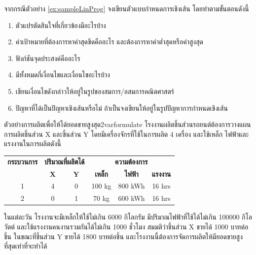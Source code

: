 \begin{example}{}{}
    จากกรณีตัวอย่าง \ref{ex:sampleLinProg} จงเขียนตัวแบบกำหนดการเชิงเส้น โดยทำตามขั้นตอนดังนี้
    \begin{enumerate}
        \item ตัวแปรตัดสินใจที่เกี่ยวข้องมีอะไรบ้าง
        \item ค่าเป้าหมายที่ต้องการหาค่าสุดขีดคืออะไร และต้องการหาค่าต่ำสุดหรือค่าสูงสุด
        \item ฟังก์ชันจุดประสงค์คืออะไร
        \item มีทั้งหมดกี่เงื่อนไขและเงื่อนไขอะไรบ้าง
        \item เขียนเงื่อนไขดังกล่าวให้อยู่ในรูปของสมการ/อสมการคณิตศาสตร์
        \item ปัญหาที่ได้เป็นปัญหาเชิงเส้นหรือไม่ ถ้าเป็นจงเขียนให้อยู่ในรูปปัญหาการกำหนดเชิงเส้น
    \end{enumerate}
\end{example}
\newpage
\begin{example}{ตัวอย่างการผลิตเพื่อให้ได้ยอดขายสูงสุด}{2varformulate}
    โรงงานผลิตชิ้นส่วนรถยนต์ต้องการวางแผนการผลิตชิ้นส่วน X และชิ้นส่วน Y
    โดยมีเครื่องจักรที่ใช้ในการผลิต 4 เครื่อง และใช้เหล็ก ไฟฟ้าและแรงงานในการผลิตดังนี้
    
    \begin{center}
        \begin{tabular}{c|cc|ccc}
        \toprule
        \textbf{กระบวนการ} & \multicolumn{2}{c|}{\textbf{ปริมาณที่ผลิตได้}} & \multicolumn{3}{c}{\textbf{ความต้องการ}} \\
         & \textbf{X} & \textbf{Y} & \textbf{เหล็ก} & \textbf{ไฟฟ้า} & \textbf{แรงงาน} \\
        \hline
        1 & 4 & 0 & 100 kg & 800 kWh & 16 hrs \\
        2 & 0 & 1 & 70 kg  & 600 kWh & 16 hrs \\
        \bottomrule
        \end{tabular}
    \end{center}
    ในแต่ละวัน โรงงานจะมีเหล็กให้ใช้ไม่เกิน 6000 กิโลกรัม มีปริมาณไฟฟ้าที่ใช้ได้ไม่เกิน 100000 กิโลวัตต์ และใช้แรงงานคนงานรวมกันได้ไม่เกิน 1000 ชั่วโมง
    สมมติว่าชิ้นส่วน X ขายได้ 1000  บาทต่อชิ้น ในขณะที่ชิ้นส่วน Y ขายได้ 1800 บาทต่อชิ้น และโรงงานนี้ต้องการจัดการผลิตให้มียอดขายสูงที่สุดเท่าที่จะทำได้
\end{example}

